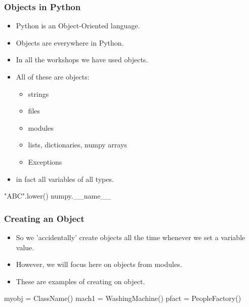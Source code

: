 \documentclass{beamer}
\begin{document}
\begin{frame}[fragile]
\frametitle{Objects in Python}
\begin{itemize}
\item Python is an Object-Oriented language.
\item Objects are everywhere in Python.
\item In all the workshops we have used objects.
\item All of these are objects:
\begin{itemize}
\item strings
\item files
\item modules
\item lists, dictionaries, numpy arrays
\item Exceptions
\end{itemize}
\item in fact all variables of all types.
\end{itemize}
\begin{code}
"ABC".lower()
numpy.__name__
\end{code}
\end{frame}

\begin{frame}[fragile]
\frametitle{Creating an Object}
\begin{itemize}
\item So we 'accidentally' create objects all the time whenever we set a variable value.
\item However, we will focus here on objects from modules.
\item These are examples of creating on object.
\end{itemize}

\begin{code}
myobj = ClassName()
mach1 = WashingMachine()
pfact = PeopleFactory()
\end{code}

\end{frame}
\end{document}
